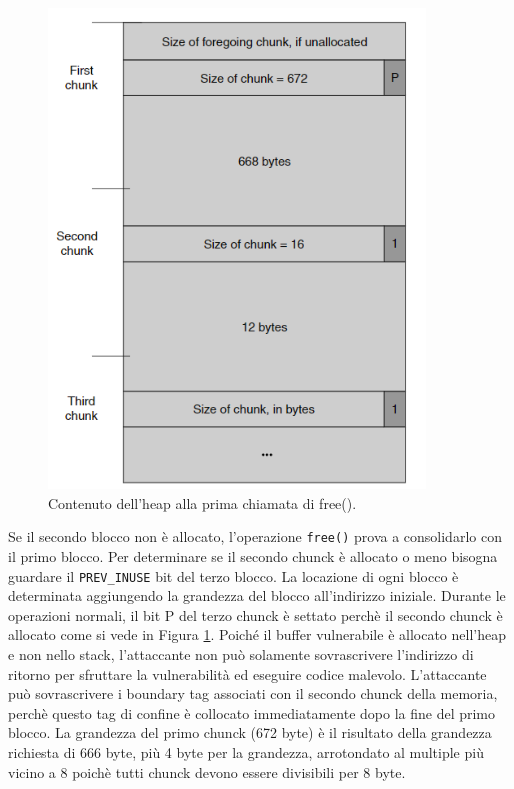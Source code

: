 \begin{figure}[H] 
	\centering
    \includegraphics[width=10cm, keepaspectratio]{santini/img/cap_4/heap_prima_free.png}
	\caption{Contenuto dell'heap alla prima chiamata di free().}\label{fig:heap_prima_free}
\end{figure}
Se il secondo blocco non è allocato, l'operazione \verb|free()| prova a consolidarlo con il primo blocco. Per determinare se il secondo chunck è allocato o meno bisogna guardare il \verb|PREV_INUSE| bit del terzo blocco. La locazione di ogni blocco è determinata aggiungendo la grandezza del blocco all'indirizzo iniziale. Durante le operazioni normali, il bit P del terzo chunck è settato perchè il secondo chunck è allocato come si vede in Figura \ref{fig:heap_prima_free}.
Poiché il buffer vulnerabile è allocato nell'heap e non nello stack, l'attaccante non può solamente sovrascrivere l'indirizzo di ritorno per sfruttare la vulnerabilità ed eseguire codice malevolo. L'attaccante può sovrascrivere i boundary tag associati con il secondo chunck della memoria, perchè questo tag di confine è collocato immediatamente dopo la fine del primo blocco. La grandezza del primo chunck (672 byte) è il risultato della grandezza richiesta di 666 byte, più 4 byte per la grandezza, arrotondato al multiple più vicino a 8 poichè tutti chunck devono essere divisibili per 8 byte. 
